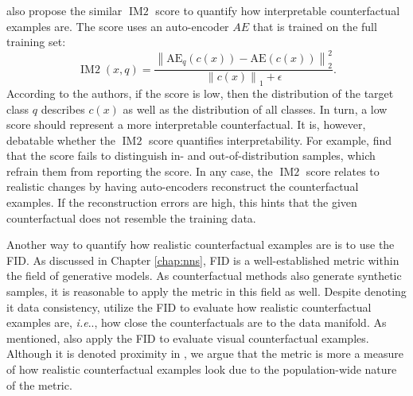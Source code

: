 \documentclass[11pt,a4paper,twoside,openright,final]{memoir}
\makeatletter
\DeclareRobustCommand\onedot{\futurelet\@let@token\@onedot}
\def\@onedot{\ifx\@let@token.\else.\null\fi\xspace}
\def\ie{\emph{i.e}\onedot} \def\Ie{\emph{I.e}\onedot}
\makeatother
\begin{document}
\citet{VanLooveren2019} also propose the similar $\operatorname{IM2}$ score to quantify how interpretable counterfactual examples are. 
The score uses an auto-encoder $AE$ that is trained on the full training set: 
\begin{equation}\label{eq:IM2}
\operatorname{IM2}\left(x, q\right)=\frac{\left\|\mathrm{AE}_{q}\left(c(x)\right)-\mathrm{AE}\left(c(x)\right)\right\|_{2}^{2}}{\left\|c(x)\right\|_{1}+\epsilon}.
\end{equation}
According to the authors, if the score is low, then the distribution of the target class $q$ describes $c(x)$ as well as the distribution of all classes.
In turn, a low score should represent a more interpretable counterfactual.
%
It is, however, debatable whether the $\operatorname{IM2}$ score quantifies interpretability.
For example, \citet{Schut2021} find that the score fails to distinguish in- and out-of-distribution samples, which refrain them from reporting the score.
In any case, the $\operatorname{IM2}$ score relates to realistic changes by having auto-encoders reconstruct the counterfactual examples.
If the reconstruction errors are high, this hints that the given counterfactual does not resemble the training data.

Another way to quantify how realistic counterfactual examples are is to use the FID.
As discussed in Chapter \ref{chap:nns}, FID is a well-established metric within the field of generative models.
As counterfactual methods also generate synthetic samples, it is reasonable to apply the metric in this field as well.
Despite denoting it data consistency, \cite{Singla2019} utilize the FID to evaluate how realistic counterfactual examples are, \ie, how close the counterfactuals are to the data manifold.
As mentioned, \citet{Rodriguez2021} also apply the FID to evaluate visual counterfactual examples. 
Although it is denoted proximity in \cite{Rodriguez2021}, we argue that the metric is more a measure of how realistic counterfactual examples look due to the population-wide nature of the metric.
\end{document}
